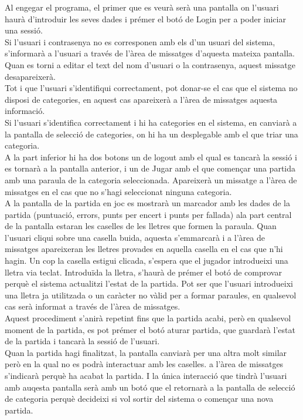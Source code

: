 Al engegar el programa, el primer que es veurà serà una pantalla on l'usuari haurà d'introduir les seves dades i prémer el botó de Login per a poder iniciar una sessió.
\\Si l'usuari i contrasenya no es corresponen amb els d'un usuari del sistema, s'informarà a l'usuari a través de l'àrea de missatges d'aquesta mateixa pantalla. Quan es torni a editar el text del nom d'usuari o la contrasenya, aquest missatge desapareixerà.
\\Tot i que l'usuari s'identifiqui correctament, pot donar-se el cas que el sistema no disposi de categories, en aquest cas apareixerà a l'àrea de missatges aquesta informació.  
\\Si l'usuari s'identifica correctament i hi ha categories en el sistema, en canviarà a la pantalla de selecció de categories, on  hi ha un desplegable amb el que triar una categoria.
\\A la part inferior hi ha dos botons un de logout amb el qual es tancarà la sessió i es tornarà a la pantalla anterior, i un de Jugar amb el que començar una partida amb una paraula de la categoria seleccionada. Apareixerà un missatge a l'àrea de missatges en el cas que no s'hagi seleccionat ninguna categoria.
\\A la pantalla de la partida en joc es mostrarà un marcador amb les dades de la partida (puntuació, errors, punts per encert i punts per fallada) ala part central de la pantalla estaran les caselles de les lletres que formen la paraula.
Quan l'usuari cliqui sobre una casella buida, aquesta s'emmarcarà i a l'àrea de missatges apareixeran les lletres provades en aquella casella en el cas que n'hi hagin. Un cop la casella estigui clicada, s'espera que el jugador introdueixi una lletra via teclat. Introduïda la lletra, s'haurà de prémer el botó de comprovar perquè el sistema actualitzi l'estat de la partida. Pot ser que l'usuari introdueixi una lletra ja utilitzada o un caràcter no vàlid per a formar paraules, en qualsevol cas serà informat a través de l'àrea de missatges.
\\Aquest procediment s'anirà repetint fins que la partida acabi, però en qualsevol moment de la partida, es pot prémer el botó aturar partida, que guardarà l'estat de la partida i tancarà la sessió de l'usuari.
\\Quan la partida hagi finalitzat, la pantalla canviarà per una altra molt similar però en la qual no es podrà interactuar amb les caselles. a l'àrea de missatges s'indicarà perquè ha acabat la partida. I la única interacció que tindrà l'usuari amb auqesta pantalla serà amb un botó que el retornarà a la pantalla de selecció de categoria perquè decideixi si vol sortir del sistema o començar una nova partida.


